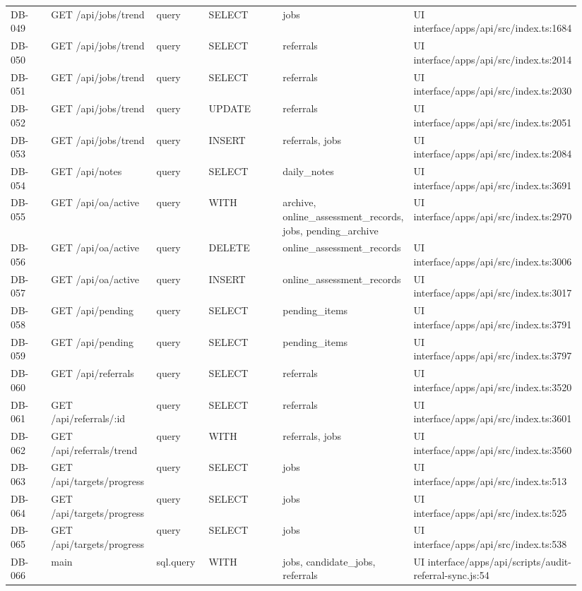 \documentclass[11pt]{article}
\begin{document}
\begin{longtable}{p{0.10\linewidth}p{0.19\linewidth}p{0.10\linewidth}p{0.18\linewidth}p{0.16\linewidth}p{0.21\linewidth}}
DB-049 & GET /api/jobs/trend & query & SELECT & jobs & UI interface/apps/api/src/index.ts:1684 \\
DB-050 & GET /api/jobs/trend & query & SELECT & referrals & UI interface/apps/api/src/index.ts:2014 \\
DB-051 & GET /api/jobs/trend & query & SELECT & referrals & UI interface/apps/api/src/index.ts:2030 \\
DB-052 & GET /api/jobs/trend & query & UPDATE & referrals & UI interface/apps/api/src/index.ts:2051 \\
DB-053 & GET /api/jobs/trend & query & INSERT & referrals, jobs & UI interface/apps/api/src/index.ts:2084 \\
DB-054 & GET /api/notes & query & SELECT & daily\_notes & UI interface/apps/api/src/index.ts:3691 \\
DB-055 & GET /api/oa/active & query & WITH & archive, online\_assessment\_records, jobs, pending\_archive & UI interface/apps/api/src/index.ts:2970 \\
DB-056 & GET /api/oa/active & query & DELETE & online\_assessment\_records & UI interface/apps/api/src/index.ts:3006 \\
DB-057 & GET /api/oa/active & query & INSERT & online\_assessment\_records & UI interface/apps/api/src/index.ts:3017 \\
DB-058 & GET /api/pending & query & SELECT & pending\_items & UI interface/apps/api/src/index.ts:3791 \\
DB-059 & GET /api/pending & query & SELECT & pending\_items & UI interface/apps/api/src/index.ts:3797 \\
DB-060 & GET /api/referrals & query & SELECT & referrals & UI interface/apps/api/src/index.ts:3520 \\
DB-061 & GET /api/referrals/:id & query & SELECT & referrals & UI interface/apps/api/src/index.ts:3601 \\
DB-062 & GET /api/referrals/trend & query & WITH & referrals, jobs & UI interface/apps/api/src/index.ts:3560 \\
DB-063 & GET /api/targets/progress & query & SELECT & jobs & UI interface/apps/api/src/index.ts:513 \\
DB-064 & GET /api/targets/progress & query & SELECT & jobs & UI interface/apps/api/src/index.ts:525 \\
DB-065 & GET /api/targets/progress & query & SELECT & jobs & UI interface/apps/api/src/index.ts:538 \\
DB-066 & main & sql.query & WITH & jobs, candidate\_jobs, referrals & UI interface/apps/api/scripts/audit-referral-sync.js:54 \\

\end{longtable}
\end{document}
